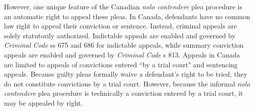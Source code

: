 However, one unique feature of the Canadian \textit{nolo contendere} plea procedure is an automatic right to appeal these pleas. In Canada, defendants have no common law right to appeal their conviction or sentence. Instead, criminal appeals are solely statutorily authorized. Indictable appeals are enabled and governed by \textit{Criminal Code} ss 675 and 686 for indictable appeals, while summary conviction appeals are enabled and governed by \textit{Criminal Code} s 813. Appeals in Canada are limited to appeals of convictions entered ``by a trial court" and sentencing appeals. Because guilty pleas formally waive a defendant's right to be tried, they do not constitute convictions by a trial court. However, because the informal \textit{nolo contendere} plea procedure is technically a conviction entered by a trial court, it may be appealed by right.